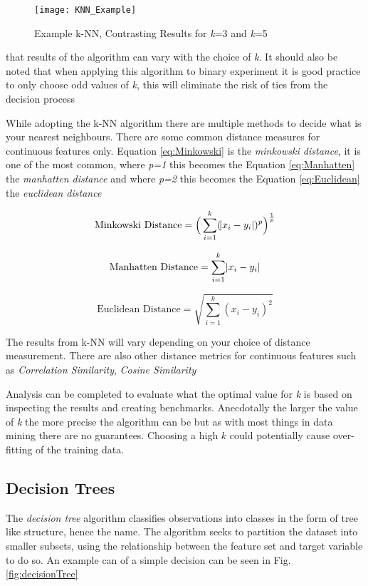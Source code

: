 \begin{figure}[H]
	\texttt{[image: KNN\_Example]}
	\caption{Example k-NN, Contrasting Results for \textit{k}=3 and \textit{k}=5 }
	\label{fig:KNN_Example}
\end{figure}

that results of the algorithm can vary with the choice of \textit{k}. It should also be noted that when applying this algorithm to binary experiment it is good practice to only choose odd values of \textit{k}, this will eliminate the risk of ties from the decision process \citep{keller_fuzzy_1985} 

While adopting the k-NN algorithm there are multiple methods to decide what is your nearest neighbours. There are some common distance measures for continuous features only. Equation \ref{eq:Minkowski} is the \textit{minkowski distance}, it is one of the most common, where \textit{p=1} this becomes the Equation \ref{eq:Manhatten} the \textit{manhatten distance} and where \textit{p=2} this becomes the Equation \ref{eq:Euclidean} the \textit{euclidean distance}

\begin{equation} \label{eq:Minkowski}
	\text{Minkowski Distance}   = \Big(\sum_{i=1}^k (\abs{x_i-y_i})^p\Big)^\frac{1}{p}
\end{equation}

\begin{equation} \label{eq:Manhatten}
	\text{Manhatten Distance}   = \sum_{i=1}^k \abs{x_i-y_i}
\end{equation}

\begin{equation} \label{eq:Euclidean}
	\text{Euclidean Distance}   = \sqrt{\sum_{i=1}^k (x_i-y_i)^2}
\end{equation}

The results from k-NN will vary depending on your choice of distance measurement. There are also other distance metrics for continuous features such as \textit{Correlation Similarity}, \textit{Cosine Similarity} \citep{sarwar_item-based_2001}

Analysis can be completed to evaluate what the optimal value for \textit{k} is based on inspecting the results and creating benchmarks. Anecdotally the larger the value of \textit{k} the more precise the algorithm can be but as with most things in data mining there are no guarantees. Choosing a high $k$ could potentially cause over-fitting of the training data.

\subsection{Decision Trees} \label{decTrees}
The \textit{decision tree} algorithm classifies observations into classes in the form of tree like structure, hence the name. The algorithm seeks to partition the dataset into smaller subsets, using the relationship between the feature set and target variable to do so. An example can of a simple decision can be seen in Fig. \ref{fig:decisionTree}

